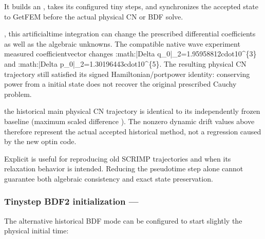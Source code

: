 \documentclass[letterpaper,10pt,english]{sphinxmanual}
\begin{document}
\sphinxAtStartPar
It builds an ,
takes its configured tiny steps, and synchronizes the
accepted state to GetFEM before the actual physical
CN or BDF solve.

\sphinxAtStartPar
{}, this artificial\sphinxhyphen{}time
integration can change the prescribed differential
coefficients as well as the algebraic unknowns.
The compatible native wave experiment measured
coefficient\sphinxhyphen{}vector changes
:math:\textasciigrave{}|Delta q\_0|\_2=1.95958812cdot10\textasciicircum{}\{\sphinxhyphen{}3\}\textasciigrave{}
and :math:\textasciigrave{}|Delta p\_0|\_2=1.30196443cdot10\textasciicircum{}\{\sphinxhyphen{}5\}\textasciigrave{}.
The resulting physical CN trajectory still satisfied
its signed Hamiltonian/port\sphinxhyphen{}power identity: conserving
power from a  initial state does not
recover the original prescribed Cauchy problem.

\sphinxAtStartPar
{}
the historical  main physical CN
trajectory is identical to its independently
frozen baseline (maximum scaled difference ).
The nonzero dynamic drift values above therefore
represent the actual accepted historical method,
not a regression caused by the new opt\sphinxhyphen{}in code.

\sphinxAtStartPar
Explicit  is useful for reproducing old SCRIMP
trajectories and when its relaxation behavior is intended.
Reducing the pseudo\sphinxhyphen{}time step alone cannot guarantee
both algebraic consistency and exact state preservation.


\subsubsection{Tiny\sphinxhyphen{}step BDF2 initialization — }
\label{\detokenize{initialization:tiny-step-bdf2-initialization-bdf}}
\sphinxAtStartPar
The alternative historical BDF mode can be configured
to start slightly  the physical initial time:

\begin{sphinxVerbatim}[commandchars=\\\{\}]
      
\end{sphinxVerbatim}
\end{document}

